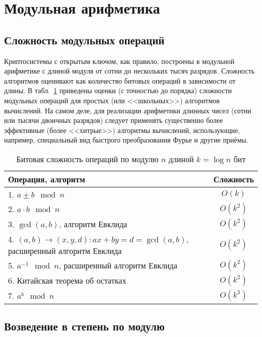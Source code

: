 \section{Модульная арифметика}

\subsection{Сложность модульных операций}

Криптосистемы с открытым ключом, как правило, построены в модульной арифметике с длиной модуля от сотни до нескольких тысяч разрядов. Сложность алгоритмов оценивают как количество битовых операций в зависимости от длины. В табл.~\ref{tab:mod-binary-complexity} приведены оценки (с точностью до порядка) сложности модульных операций для простых (или <<школьных>>) алгоритмов вычислений. На самом деле, для реализации арифметики длинных чисел (сотни или тысячи двоичных разрядов) следует применять существенно более эффективные (более <<хитрые>>) алгоритмы вычислений, использующие, например, специальный вид быстрого преобразования Фурье и другие приёмы.

\begin{table}[!ht]
    \centering
    \caption{Битовая сложность операций по модулю $n$ длиной $k= \log n$ бит\label{tab:mod-binary-complexity}}
    \begin{tabular}{| p{} | c |}
        \hline
        Операция, алгоритм & Сложность \\
        \hline
        1. $a \pm b \mod n$ & $O(k)$ \\
        2. $a \cdot b \mod n$ & $O(k^2)$ \\
        3. $\gcd(a, b)$, алгоритм Евклида & $O(k^2)$ \\
        4. $(a,b) \rightarrow (x,y,d) : ax + by = d = \gcd(a,b)$, расширенный алгоритм Евклида & $O(k^2)$ \\
        5. $a^{-1} \mod n$, расширенный алгоритм Евклида & $O(k^2)$ \\
        6. Китайская теорема об остатках & $O(k^2)$ \\
        7. $a^b \mod n$ & $O(k^3)$ \\
        \hline
    \end{tabular}

\end{table}

\subsection{Возведение в степень по модулю}

